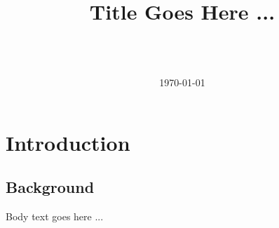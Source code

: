 \documentclass{mybook}
\title{\huge{\textbf{Title Goes Here ...}}}
\author{\name \\ \affiliation \\ \email}
\date{\today}
\begin{document}
\maketitle
\tableofcontents
\newpage

% 

\chapter{Introduction}
\section{Background}
Body text goes here ...

\lipsum[1-3]

\end{document}
